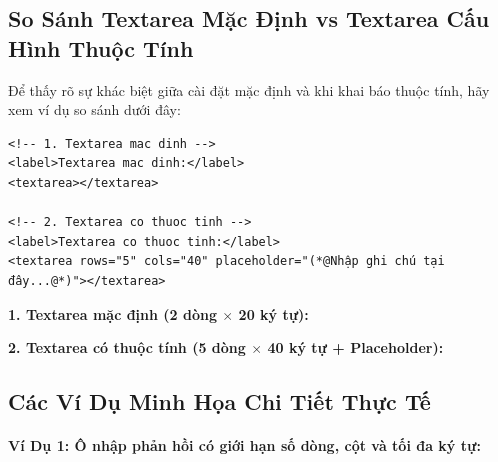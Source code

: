 \documentclass[11pt,oneside]{book}
\begin{document}
\subsection{So Sánh Textarea Mặc Định vs Textarea Cấu Hình Thuộc Tính}

Để thấy rõ sự khác biệt giữa cài đặt mặc định và khi khai báo thuộc tính, hãy xem ví dụ so sánh dưới đây:

\begin{codeWindow}
\begin{lstlisting}[language=HTML5]
<!-- 1. Textarea mac dinh -->
<label>Textarea mac dinh:</label>
<textarea></textarea>

<!-- 2. Textarea co thuoc tinh -->
<label>Textarea co thuoc tinh:</label>
<textarea rows="5" cols="40" placeholder="(*@Nhập ghi chú tại đây...@*)"></textarea>
\end{lstlisting}
\end{codeWindow}

\begin{browserWindow}
\sffamily\small
\textbf{1. Textarea mặc định (2 dòng $\times$ 20 ký tự):} \par\vspace{4pt}
\tcbox[arc=2pt, colback=white, colframe=primaryBlue!40, boxsep=2pt, width=0.45\linewidth, height=30pt]{} \par\vspace{8pt}

\textbf{2. Textarea có thuộc tính (5 dòng $\times$ 40 ký tự + Placeholder):} \par\vspace{4pt}
\end{browserWindow}

\subsection{Các Ví Dụ Minh Họa Chi Tiết Thực Tế}

\paragraph{Ví Dụ 1: Ô nhập phản hồi có giới hạn số dòng, cột và tối đa ký tự:}
\end{document}

